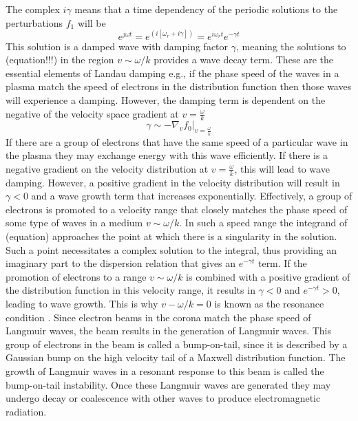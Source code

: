 The complex $i\gamma$ means that a time dependency of the periodic solutions to the perturbations $f_1$ will be 
\begin{equation}
e^{j\omega t}=e^{(i[\omega_r + i\gamma])}=e^{i\omega_rt}e^{-\gamma t}
\end{equation}
This solution is a damped wave with damping factor $\gamma$, meaning the solutions to (equation!!!) in the region $v \sim \omega/k$ provides a wave decay term. These are the essential elements of Landau damping e.g., if the phase speed of the waves in a plasma match the speed of electrons in the distribution function then those waves will experience a damping. However, the damping term is dependent on the negative of the velocity space gradient at $v=\frac{\omega}{k}$ \citep{melrose1989}
\begin{equation}
\gamma \sim -\nabla_v f_0|_{v=\frac{\omega}{k}}
\end{equation}
If there are a group of electrons that have the same speed of a particular wave in the plasma they may exchange energy with this wave efficiently. If there is a negative gradient on the velocity distribution at $v=\frac{\omega}{k}$, this will lead to wave damping. However, a positive gradient in the velocity distribution will result in $\gamma <0$ and a wave growth term that increases exponentially. Effectively, %
a group of electrons is promoted to a velocity range that closely matches the phase speed of some type of waves in a medium $v \sim \omega/k$. In such a speed range the integrand of (equation) approaches the point at which there is a singularity in the solution. Such a point necessitates a complex solution to the integral, thus providing an imaginary part to the dispersion relation that gives an $e^{-\gamma t}$ term. If the promotion of electrons to a range $v \sim \omega/k$ is combined with a positive gradient of the distribution function in this velocity range, it results in $\gamma < 0$ and $e^{-\gamma t}>0$, leading to wave growth. This is why $v - \omega/k=0$
is known as the resonance condition \citep{melrose1989}. Since electron beams in the corona match the phase speed of Langmuir waves, the beam results in the generation of Langmuir waves. This group of electrons in the beam is called a bump-on-tail, since it is described by a Gaussian bump on the high velocity tail of a Maxwell distribution function. The growth of Langmuir waves in a resonant response to this beam is called the bump-on-tail instability. Once these Langmuir waves are generated they may undergo decay or coalescence with other waves to produce electromagnetic radiation. 

